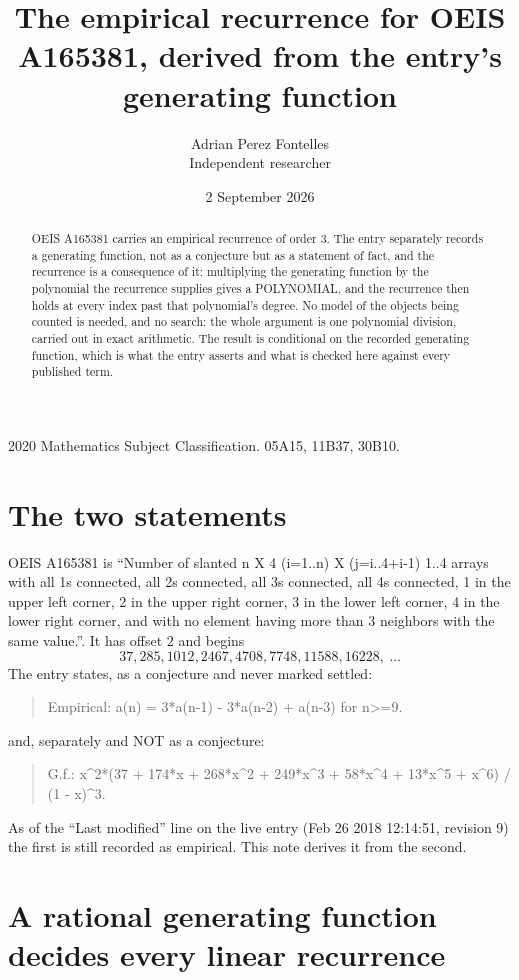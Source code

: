 \documentclass[11pt,a4paper]{article}
\title{The empirical recurrence for OEIS A165381, derived from the entry's generating function}
\author{Adrian Perez Fontelles\\ \small Independent researcher}
\date{2 September 2026}
\theoremstyle{plain}
\theoremstyle{definition}
\begin{document}
\maketitle

\begin{abstract}
OEIS A165381 carries an empirical recurrence of order $3$. The entry separately records a
generating function, not as a conjecture but as a statement of fact, and the recurrence is a
consequence of it: multiplying the generating function by the polynomial the recurrence
supplies gives a POLYNOMIAL, and the recurrence then holds at every index past that
polynomial's degree. No model of the objects being counted is needed, and no search: the
whole argument is one polynomial division, carried out in exact arithmetic. The result is
conditional on the recorded generating function, which is what the entry asserts and what is
checked here against every published term.
\end{abstract}

\noindent\small 2020 Mathematics Subject Classification. 05A15, 11B37, 30B10.\normalsize

\section{The two statements}

OEIS A165381 is ``Number of slanted n X 4 (i=1..n) X (j=i..4+i-1) 1..4 arrays with all 1s connected, all 2s connected, all 3s connected, all 4s connected, 1 in the upper left corner, 2 in the upper right corner, 3 in the lower left corner, 4 in the lower right corner, and with no element having more than 3 neighbors with the same value.''. It has offset $2$ and begins
\[
37, 285, 1012, 2467, 4708, 7748, 11588, 16228,\ \dots
\]
The entry states, as a conjecture and never marked settled:
\begin{quote}
Empirical: a(n) = 3*a(n-1) - 3*a(n-2) + a(n-3) for n>=9.
\end{quote}
and, separately and NOT as a conjecture:
\begin{quote}
G.f.: x\^{}2*(37 + 174*x + 268*x\^{}2 + 249*x\^{}3 + 58*x\^{}4 + 13*x\^{}5 + x\^{}6) / (1 - x)\^{}3.
\end{quote}
As of the ``Last modified'' line on the live entry (Feb 26 2018 12:14:51, revision 9) the first is still
recorded as empirical. This note derives it from the second.

\section{A rational generating function decides every linear recurrence}
\end{document}
